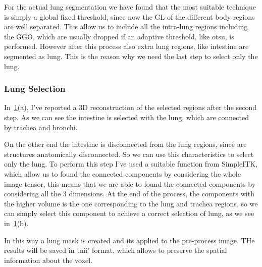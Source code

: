 \documentclass{standalone}
\begin{document}
	For the actual lung segmentation we have found that the most suitable technique is simply a global fixed threshold, since now the GL of the different body regions are well separated. This allow us to include all the intra-lung regions including the GGO, which are usually dropped if an adaptive threshold, like otsu, is performed.
	However after this process  also extra lung regions, like intestine are segmented as lung. This is the reason why we need the last step to select only the lung.
	
	\subsubsection*{Lung Selection}
	
	In \figurename\,\ref{fig:lungSelection}(a), I've reported a 3D reconstruction of the selected regions after the second step. As we can see the intestine is selected with the lung, which are connected by trachea and bronchi. 
	
	
	
	\begin{figure}[h]\label{fig:lungSelection}
		\centering
		\caption{}
	\end{figure}
	
	On the other end the intestine is disconnected from the lung regions, since are structures anatomically disconnected. So we can use this characteristics to select only the lung. To perform this step I've used a suitable function from SimpleITK, which allow us to found the connected components by considering the whole image tensor, this means that we are able to found the connected components by considering all the 3 dimensions. At the end of the process, the components with the higher volume is the one corresponding to the lung and trachea regions, so we can simply select this component to achieve a correct selection of lung, as we see in \figurename\,\ref{fig:lungSelection}(b).
	
	
	In this way a lung mask is created and its applied to the pre-process image. THe results will be saved in '.nii' format, which allows to preserve the spatial information about the voxel.
	
	
	
		
\end{document}
